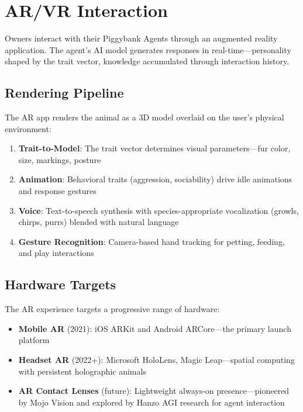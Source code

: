 \documentclass[11pt,letterpaper]{article}
\begin{document}
\section{AR/VR Interaction}
\label{sec:arvr}

Owners interact with their Piggybank Agents through an augmented reality application. The agent's AI model generates responses in real-time---personality shaped by the trait vector, knowledge accumulated through interaction history.

\subsection{Rendering Pipeline}

The AR app renders the animal as a 3D model overlaid on the user's physical environment:

\begin{enumerate}
    \item \textbf{Trait-to-Model}: The trait vector determines visual parameters---fur color, size, markings, posture
    \item \textbf{Animation}: Behavioral traits (aggression, sociability) drive idle animations and response gestures
    \item \textbf{Voice}: Text-to-speech synthesis with species-appropriate vocalization (growls, chirps, purrs) blended with natural language
    \item \textbf{Gesture Recognition}: Camera-based hand tracking for petting, feeding, and play interactions
\end{enumerate}

\subsection{Hardware Targets}

The AR experience targets a progressive range of hardware:

\begin{itemize}
    \item \textbf{Mobile AR} (2021): iOS ARKit and Android ARCore---the primary launch platform
    \item \textbf{Headset AR} (2022+): Microsoft HoloLens, Magic Leap---spatial computing with persistent holographic animals
    \item \textbf{AR Contact Lenses} (future): Lightweight always-on presence---pioneered by Mojo Vision and explored by Hanzo AGI research for agent interaction
\end{itemize}
\end{document}

